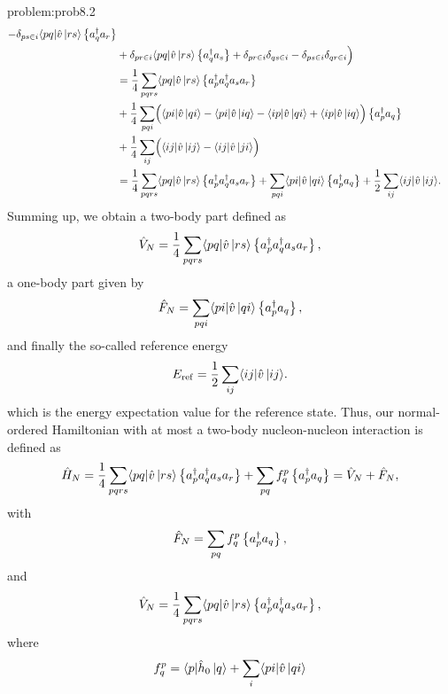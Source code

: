 \begin{sol}{problem:prob8.2}
\begin{align*}
            - \delta_{ps \in i}\langle pq|\hat{v}\,|{rs}\rangle \left\{a^\dagger_q a_r\right\}\\
        & + \delta_{pr \in i} \langle pq|\hat{v}\,|{rs}\rangle \left\{a^\dagger_q a_s\right\}+ \delta_{pr \in i} \delta_{qs \in i}- \delta_{ps \in i} \delta_{qr \in i} \Bigr) \\
        &= \frac{1}{4} \sum_{pqrs} \langle pq|\hat{v}\,|{rs}\rangle \left\{a^\dagger_p a^\dagger_q a_s  a_r\right\}\\
        &  + \frac{1}{4} \sum_{pqi} \Bigl(\langle pi|\hat{v}\,|{qi}\rangle - \langle pi|\hat{v}\,|{iq}\rangle - \langle ip|\hat{v}\,|{qi}\rangle + \langle ip|\hat{v}\,|{iq}\rangle\Bigr) \left\{a^\dagger_p a_q\right\}\\
        &  + \frac{1}{4} \sum_{ij} \Bigl(\langle ij|\hat{v}\,|{ij}\rangle- \langle ij|\hat{v}\,|{ji}\rangle\Bigr)\\
        &= \frac{1}{4} \sum_{pqrs} \langle pq|\hat{v}\,|{rs}\rangle \left\{a^\dagger_p a^\dagger_q a_s  a_r\right\}
            + \sum_{pqi} \langle pi|\hat{v}\,|{qi}\rangle \left\{a^\dagger_p a_q\right\} 
            + \frac{1}{2} \sum_{ij} \langle ij|\hat{v}\,|{ij}\rangle.
    \end{align*}
Summing up, we obtain a two-body part defined as 
    \begin{equation*}
            \hat{V}_N = \frac{1}{4} \sum_{pqrs} \langle pq|\hat{v}\,|{rs}\rangle 
                \left\{a^\dagger_p a^\dagger_q a_s  a_r\right\},
    \end{equation*}
a one-body part given by
    \begin{equation*}
            \hat{F}_N = \sum_{pqi} \langle pi|\hat{v}\,|{qi}\rangle \left\{a^\dagger_p a_q\right\}, 
    \end{equation*}
    and finally the so-called reference energy 
    \begin{equation*}
                E_{\mathrm{ref}}= \frac{1}{2} \sum_{ij} \langle ij|\hat{v}\,|{ij}\rangle.
    \end{equation*}
which is the energy expectation value for the reference state.
Thus, our normal-ordered Hamiltonian with at most a two-body nucleon-nucleon interaction is defined as 
\[
\hat{H}_N =\frac{1}{4} \sum_{pqrs} \langle pq|\hat{v}\,|{rs}\rangle \left\{a^\dagger_p a^\dagger_q a_s  a_r\right\} 
+ \sum_{pq} f_q^p \left\{a^\dagger_p a_q\right\}= \hat{V}_N + \hat{F}_N,
\]
with 
\[
\hat{F}_N = \sum_{pq} f_q^p \left\{a^\dagger_p a_q\right\},
\]
and 
\[
\hat{V}_N = \frac{1}{4} \sum_{pqrs} \langle pq|\hat{v}\,|{rs}\rangle \left\{a^\dagger_p a^\dagger_q a_s  a_r\right\},
\]
where 
\[
  f_q^p = \langle p|\hat{h}_0\,|{q}\rangle + \sum_i \langle pi|\hat{v}\,|{qi}\rangle
\]
\end{sol}

